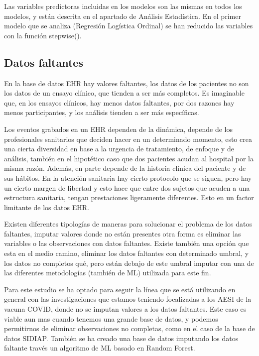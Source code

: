 \documentclass[
]{article}
\begin{document}
Las variables predictoras incluidas en los modelos son las mismas en
todos los modelos, y están descrita en el apartado de Análisis
Estadística. En el primer modelo que se analiza (Regresión Logística
Ordinal) se han reducido las variables con la función stepwise().

\hypertarget{datos-faltantes}{%
\subsection{Datos faltantes}\label{datos-faltantes}}

En la base de datos EHR hay valores faltantes, los datos de los
pacientes no son los datos de un ensayo clínico, que tienden a ser más
completos. Es imaginable que, en los ensayos clínicos, hay menos datos
faltantes, por dos razones hay menos participantes, y los análisis
tienden a ser más específicas.

Los eventos grabados en un EHR dependen de la dinámica, depende de los
profesionales sanitarios que deciden hacer en un determinado momento,
esto crea una cierta diversidad en base a la urgencia de tratamiento, de
enfoque y de análisis, también en el hipotético caso que dos pacientes
acudan al hospital por la misma razón. Además, en parte depende de la
historia clínica del paciente y de sus hábitos. En la atención sanitaria
hay cierto protocolo que se siguen, pero hay un cierto margen de
libertad y esto hace que entre dos sujetos que acuden a una estructura
sanitaria, tengan prestaciones ligeramente diferentes. Esto en un factor
limitante de los datos EHR.

Existen diferentes tipologías de maneras para solucionar el problema de
los datos faltantes, imputar valores donde no están presentes otra forma
es eliminar las variables o las observaciones con datos faltantes.
Existe también una opción que esta en el medio camino, eliminar los
datos faltantes con determinado umbral, y los datos no completos qué,
pero están debajo de este umbral imputar con una de las diferentes
metodologías (también de ML) utilizada para este fin.

Para este estudio se ha optado para seguir la línea que se está
utilizando en general con las investigaciones que estamos teniendo
focalizadas a los AESI de la vacuna COVID, donde no se imputan valores a
los datos faltantes. Este caso es viable aun mas cuando tenemos una
grande base de datos, y podemos permitirnos de eliminar observaciones no
completas, como en el caso de la base de datos SIDIAP. También se ha
creado una base de datos imputando los datos faltante través un
algoritmo de ML basado en Random Forest.
\end{document}
